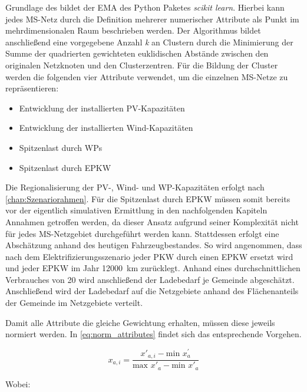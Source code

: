 Grundlage des \kmeans bildet der \gls{EMA} des Python Paketes \textit{scikit learn}. \cite{scikit-learn2011}
Hierbei kann jedes \gls{MS}-Netz durch die Definition mehrerer numerischer Attribute als Punkt im mehrdimensionalen Raum beschrieben werden.
Der Algorithmus bildet anschließend eine vorgegebene Anzahl \textit{k} an Clustern durch die Minimierung der Summe der quadrierten gewichteten euklidischen Abstände zwischen den originalen Netzknoten und den Clusterzentren.
Für die Bildung der Cluster werden die folgenden vier Attribute verwendet, um die einzelnen \gls{MS}-Netze zu repräsentieren:

\begin{itemize}
	\item Entwicklung der installierten \gls{PV}-Kapazitäten
	\item Entwicklung der installierten Wind-Kapazitäten
	\item Spitzenlast durch \glspl{WP}
	\item Spitzenlast durch \gls{EPKW}
\end{itemize}

Die Regionalisierung der \gls{PV}-, Wind- und \gls{WP}-Kapazitäten erfolgt nach \autoref{chap:Szenariorahmen}.
Für die Spitzenlast durch \gls{EPKW} müssen somit bereits vor der eigentlich simulativen Ermittlung in den nachfolgenden Kapiteln Annahmen getroffen werden, da dieser Ansatz aufgrund seiner Komplexität nicht für jedes \gls{MS}-Netzgebiet durchgeführt werden kann.
Stattdessen erfolgt eine Abschätzung anhand des heutigen Fahrzeugbestandes.
So wird angenommen, dass nach dem Elektrifizierungsszenario jeder \gls{PKW} durch einen \gls{EPKW} ersetzt wird und jeder \gls{EPKW} im Jahr \SI{12000}{\km} zurücklegt.
Anhand eines durchschnittlichen Verbrauches von \SI{20}{\kwhkm} wird anschließend der Ladebedarf je Gemeinde abgeschätzt.
Anschließend wird der Ladebedarf auf die Netzgebiete anhand des Flächenanteils der Gemeinde im Netzgebiete verteilt.\medskip

Damit alle Attribute die gleiche Gewichtung erhalten, müssen diese jeweils normiert werden.
In \autoref{eq:norm_attributes} findet sich das entsprechende Vorgehen.

\begin{equation}
	x_{a, i} = \frac{x'_{a, i} - \text{min~} x^{'}_a}{\text{max~} x'_a - \text{min~} x'_a}
	\label{eq:norm_attributes}
\end{equation}

\noindent Wobei:


